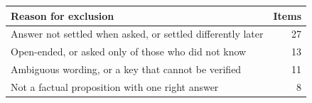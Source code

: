 \begin{tabular}{p{11cm}r}
\toprule
Reason for exclusion & Items \\
\midrule
Answer not settled when asked, or settled differently later & 27 \\
Open-ended, or asked only of those who did not know & 13 \\
Ambiguous wording, or a key that cannot be verified & 11 \\
Not a factual proposition with one right answer &  8 \\
\bottomrule
\end{tabular}
